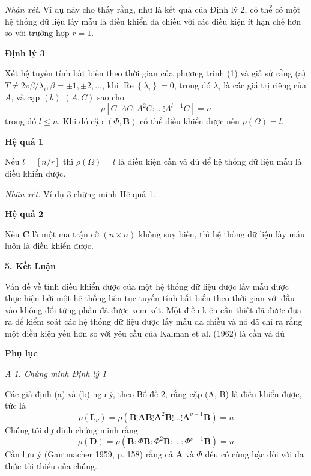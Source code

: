\documentclass[12pt,a4paper]{article}
\begin{document}
\textit{Nhận xét}. Ví dụ này cho thấy rằng, như là kết quả của Định lý 2, có thể có một hệ thống dữ liệu lấy mẫu là điều khiển đa chiều với các điều kiện ít hạn chế hơn so với trường hợp $r=1$.

\textbf{Định lý 3}

Xét hệ tuyến tính bất biến theo thời gian của phương trình (1) và giả sử rằng (a) $T \neq 2 \pi \beta / \lambda_i, \beta= \pm 1, \pm 2, \ldots$, khi $\operatorname{Re}\left\{\lambda_i \right\}=0$, trong đó $\lambda_i$ là các giá trị riêng của $A$, và cặp $(b)$ $(A, C)$ sao cho
$$
\rho\left[C: A C: A^2 C: \ldots \vdots A^{l-1} C\right]=n
$$
trong đó $l \leqslant n$. Khi đó cặp $(\Phi, \mathbf{B})$ có thể điều khiển được nếu $\rho(\Omega)=l$.

\textbf{Hệ quả 1}

Nếu $l=[n / r]$ thì $\rho(\Omega)=l$ là điều kiện cần và đủ để hệ thống dữ liệu mẫu là điều khiển được.

\textit{Nhận xét.} Ví dụ 3 chứng minh Hệ quả 1.

\textbf{Hệ quả 2}

Nếu $\boldsymbol{C}$ là một ma trận cỡ $(n \times n)$ không suy biến, thì hệ thống dữ liệu lấy mẫu luôn là điều khiển được.

\textbf{5. Kết Luận}

Vấn đề về tính điều khiển được của một hệ thống dữ liệu được lấy mẫu được thực hiện bởi một hệ thống liên tục tuyến tính bất biến theo thời gian với đầu vào không đổi từng phần đã được xem xét. Một điều kiện cần thiết đã được đưa ra để kiểm soát các hệ thống dữ liệu được lấy mẫu đa chiều và nó đã chỉ ra rằng một điều kiện yếu hơn so với yêu cầu của Kalman et al. (1962) là cần và đủ

\textbf{Phụ lục}

\textit{A 1. Chứng minh Định lý 1}

Các giả định (a) và (b) ngụ ý, theo Bổ đề 2, rằng cặp (A, B) là điều khiển được, tức là
\begin{equation}\label{pt11}\tag{11}
	\rho\left(\mathbf{L}_\nu\right)=\rho\left(\mathbf{B} \vdots \mathbf{A B} \vdots \mathbf{A}^2 \mathbf{B} \vdots \ldots \vdots \mathbf{A}^{\nu-1} \mathbf{B}\right)=n
\end{equation}
Chúng tôi dự định chứng minh rằng
$$
\rho(\mathbf{D})=\rho\left(\mathbf{B}: \Phi \mathbf{B}: \Phi^2 \mathbf{B}: \ldots: \Phi^{\nu-1 } \mathbf{B}\right)=n
$$
Cần lưu ý (Gantmacher 1959, p. 158) rằng cả $\mathbf{A}$ và $\Phi$ đều có cùng bậc đối với đa thức tối thiểu của chúng.
\end{document}
